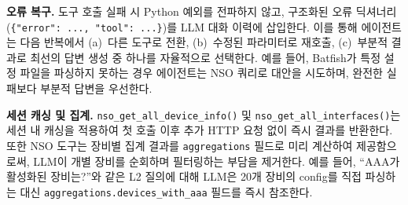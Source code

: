 \textbf{오류 복구.}
도구 호출 실패 시 Python 예외를 전파하지 않고,
구조화된 오류 딕셔너리(\texttt{\{"error":~...,~"tool":~...\}})를
LLM 대화 이력에 삽입한다.
이를 통해 에이전트는 다음 반복에서
(a)~다른 도구로 전환,
(b)~수정된 파라미터로 재호출,
(c)~부분적 결과로 최선의 답변 생성
중 하나를 자율적으로 선택한다.
예를 들어, Batfish가 특정 설정 파일을 파싱하지 못하는 경우
에이전트는 NSO 쿼리로 대안을 시도하며,
완전한 실패보다 부분적 답변을 우선한다.

\textbf{세션 캐싱 및 집계.}
\texttt{nso\_get\_all\_device\_info()} 및
\texttt{nso\_get\_all\_interfaces()}는 세션 내 캐싱을 적용하여
첫 호출 이후 추가 HTTP 요청 없이 즉시 결과를 반환한다.
또한 NSO 도구는 장비별 집계 결과를
\texttt{aggregations} 필드로 미리 계산하여 제공함으로써,
LLM이 개별 장비를 순회하며 필터링하는 부담을 제거한다.
예를 들어, ``AAA가 활성화된 장비는?''와 같은 L2 질의에 대해
LLM은 20개 장비의 config를 직접 파싱하는 대신
\texttt{aggregations.devices\_with\_aaa} 필드를 즉시 참조한다.

